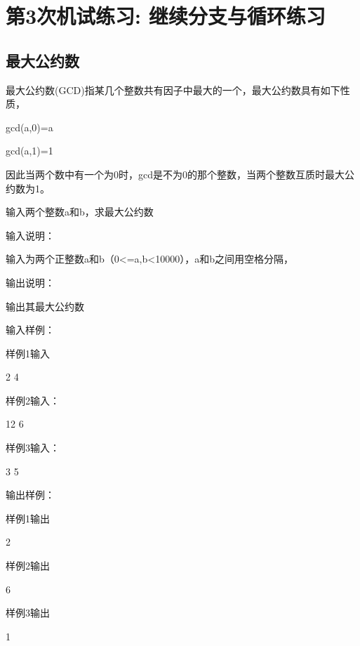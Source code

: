 %
%
%
\chapter{第3次机试练习: 继续分支与循环练习}

\section{最大公约数}	
最大公约数(GCD)指某几个整数共有因子中最大的一个，最大公约数具有如下性质，

gcd(a,0)=a

gcd(a,1)=1

因此当两个数中有一个为0时，gcd是不为0的那个整数，当两个整数互质时最大公约数为1。

输入两个整数a和b，求最大公约数

输入说明：

输入为两个正整数a和b（0<=a,b<10000），a和b之间用空格分隔，

输出说明：

输出其最大公约数

输入样例：

样例1输入

2 4

样例2输入：

12 6

样例3输入：

3 5

输出样例：

样例1输出

2

样例2输出

6

样例3输出

1

